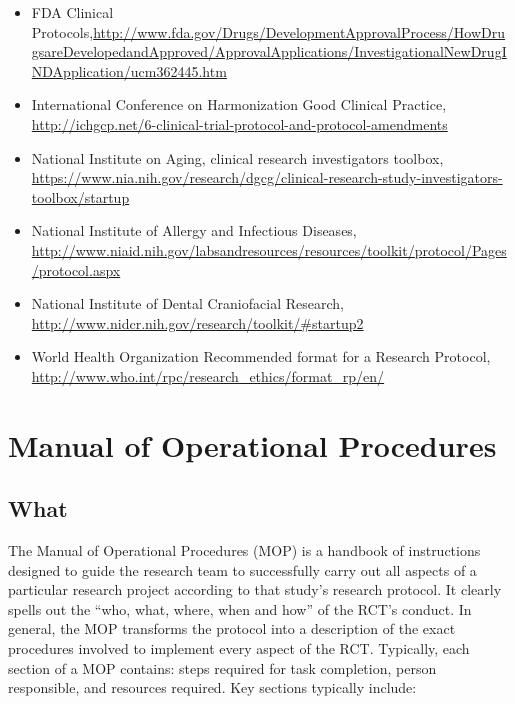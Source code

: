 \documentclass[]{book}
\providecommand{\tightlist}{%
  \setlength{\itemsep}{0pt}\setlength{\parskip}{0pt}}
\theoremstyle{definition}
\theoremstyle{definition}
\theoremstyle{definition}
\theoremstyle{remark}
\begin{document}
\begin{itemize}
\tightlist
\item
  FDA Clinical
  Protocols,\url{http://www.fda.gov/Drugs/DevelopmentApprovalProcess/HowDrugsareDevelopedandApproved/ApprovalApplications/InvestigationalNewDrugINDApplication/ucm362445.htm}
\item
  International Conference on Harmonization Good Clinical Practice,
  \url{http://ichgcp.net/6-clinical-trial-protocol-and-protocol-amendments}
\item
  National Institute on Aging, clinical research investigators toolbox,
  \url{https://www.nia.nih.gov/research/dgcg/clinical-research-study-investigators-toolbox/startup}
\item
  National Institute of Allergy and Infectious Diseases,
  \url{http://www.niaid.nih.gov/labsandresources/resources/toolkit/protocol/Pages/protocol.aspx}
\item
  National Institute of Dental Craniofacial Research,
  \url{http://www.nidcr.nih.gov/research/toolkit/\#startup2}
\item
  World Health Organization Recommended format for a Research Protocol,
  \url{http://www.who.int/rpc/research_ethics/format_rp/en/}
\end{itemize}

\section{Manual of Operational
Procedures}\label{manual-of-operational-procedures}

\subsection{What}\label{what-12}

The Manual of Operational Procedures (MOP) is a handbook of instructions
designed to guide the research team to successfully carry out all
aspects of a particular research project according to that study's
research protocol. It clearly spells out the ``who, what, where, when
and how'' of the RCT's conduct. In general, the MOP transforms the
protocol into a description of the exact procedures involved to
implement every aspect of the RCT. Typically, each section of a MOP
contains: steps required for task completion, person responsible, and
resources required. Key sections typically include:
\end{document}
